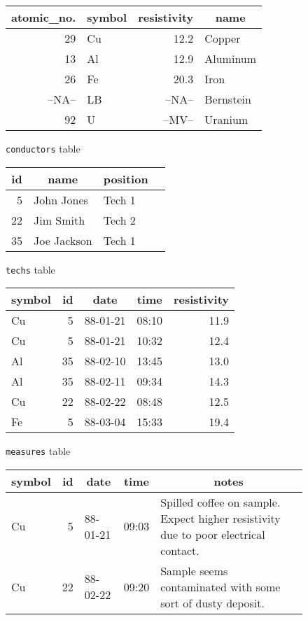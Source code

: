 \documentclass[11pt,a4paper]{report}
\begin{document}
 
\begin{figure}[htp]
\begin{center}
  \begin{tabular}[t]{|r|l|r|l|}
     \hline
     \multicolumn{1}{|c|}{atomic\_no.}&
     \multicolumn{1}{|c|}{symbol}&
     \multicolumn{1}{|c|}{resistivity}&
     \multicolumn{1}{|c|}{name}\\
     \hline
    29& Cu& 12.2  & Copper\\
    13& Al& 12.9  & Aluminum\\
    26& Fe& 20.3  & Iron\\
--NA--& LB&--NA--& Bernstein\\
    92& U &--MV--  & Uranium\\
     \hline
  \end{tabular}
 
  \smallskip
          {\verb!conductors! table }
 
  \bigskip
  \begin{tabular}[t]{|r|l|l|l|}
     \hline
     \multicolumn{1}{|c|}{id}&
     \multicolumn{1}{|c|}{name}&
     \multicolumn{1}{|c|}{position}\\
     \hline
     5& John Jones& Tech 1\\
    22& Jim Smith& Tech 2\\
    35& Joe Jackson& Tech 1\\
     \hline
  \end{tabular}
 
  \smallskip
          {\verb!techs! table }
 
  \bigskip
  \begin{tabular}[t]{|l|r|l|l|r|}
     \hline
     \multicolumn{1}{|c|}{symbol}&
     \multicolumn{1}{|c|}{id}&
     \multicolumn{1}{|c|}{date}&
     \multicolumn{1}{|c|}{time}&
     \multicolumn{1}{|c|}{resistivity}\\
     \hline
    Cu& 5& 88-01-21& 08:10& 11.9 \\
    Cu& 5& 88-01-21& 10:32& 12.4 \\
    Al&35& 88-02-10& 13:45& 13.0 \\
    Al&35& 88-02-11& 09:34& 14.3 \\
    Cu&22& 88-02-22& 08:48& 12.5 \\
    Fe& 5& 88-03-04& 15:33& 19.4 \\
     \hline
  \end{tabular}
 
  \medskip
          {\verb!measures! table }
 
  \bigskip
  \begin{tabular}[t]{|l|r|l|l|p{2.0in}|}
     \hline
     \multicolumn{1}{|c|}{symbol}&
     \multicolumn{1}{|c|}{id}&
     \multicolumn{1}{|c|}{date}&
     \multicolumn{1}{|c|}{time}&
     \multicolumn{1}{|c|}{notes}\\
     \hline
    Cu& 5& 88-01-21& 09:03& Spilled coffee on sample.  Expect higher
        resistivity due to poor electrical contact.\\
    Cu&22& 88-02-22& 09:20& Sample seems contaminated with some
        sort of dusty deposit.\\
     \hline
  \end{tabular}
 

\end{center}
\end{figure}
\end{document}
